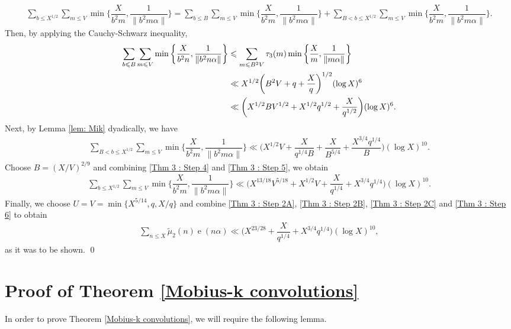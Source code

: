 \documentclass[11pt]{amsart}
\numberwithin{equation}{section}
\numberwithin{figure}{section}
\theoremstyle{definition}
\newcommand{\e}{\operatorname{e}}
\begin{document}
\begin{align*}
     \sum_{b\leqslant X ^{1/2}}\sum_{m\leqslant V}\min\bigg\{\dfrac{X}{b^2m}, \dfrac{1}{\|b^2m\alpha\|}\bigg\} =  \sum_{b\leqslant B}\sum_{m\leqslant V}\min\bigg\{\dfrac{X}{b^2m}, \dfrac{1}{\|b^2m\alpha\|}\bigg\} +  \sum_{B<b\leqslant X ^{1/2}}\sum_{m\leqslant V}\min\bigg\{\dfrac{X}{b^2m}, \dfrac{1}{\|b^2m\alpha\|}\bigg\}.
\end{align*}
Then, by applying the Cauchy-Schwarz inequality,
\begin{align}
    \sum_{b\leqslant B}\sum_{m\leqslant V}\min\bigg\{\dfrac{X}{b^2n}, \dfrac{1}{\|b^2n\alpha\|}\bigg\} &\leqslant\sum_{m\leqslant B^2V}\tau_3(m)\min\bigg\{\dfrac{X}{m}, \dfrac{1}{\|m\alpha\|}\bigg\} \notag \\
    &\ll X^{1/2}\bigg(B^2V + q + \dfrac{X}{q}\bigg)^{1/2} (\log X)^6 \notag\\
    &\ll \bigg(X^{1/2}BV^{1/2} + X^{1/2}q^{1/2} + \dfrac{X}{q^{1/2}}\bigg)(\log X)^6. \label{Thm 3 : Step 4}
\end{align}
Next, by Lemma \ref{lem: Mik} dyadically, we have
\begin{align}
  \sum_{B<b\leqslant X ^{1/2}}\sum_{m\leqslant V}\min\bigg\{\dfrac{X}{b^2m}, \dfrac{1}{\|b^2m\alpha\|}\bigg\} \ll \bigg(X^{1/2}V + \dfrac{X}{q^{1/4}B} + \dfrac{X}{B^{5/4}} + \dfrac{X^{3/4}q^{1/4}}{B}\bigg)(\log X)^{10}. \label{Thm 3 : Step 5} 
\end{align}
Choose $B=(X/V)^{2/9}$ and combining \eqref{Thm 3 : Step 4} and \eqref{Thm 3 : Step 5}, we obtain
\begin{align}
   \sum_{b\leqslant X ^{1/2}}\sum_{m\leqslant V}\min\bigg\{\dfrac{X}{b^2m}, \dfrac{1}{\|b^2m\alpha\|}\bigg\}\ll \bigg(X^{13/18}V^{5/18} + X^{1/2}V + \dfrac{X}{q^{1/4}} + X^{3/4}q^{1/4}\bigg)(\log X)^{10}. \label{Thm 3 : Step 6}  
\end{align}
Finally, we choose $U=V=\min\{ X^{5/14}, q, X/q \}$ and combine \eqref{Thm 3 : Step 2A}, \eqref{Thm 3 : Step 2B}, \eqref{Thm 3 : Step 2C} and \eqref{Thm 3 : Step 6} to obtain
\begin{align*}
    \sum_{n\leqslant X }\tilde{\mu}_2(n)\e(n\alpha)\ll \bigg(X^{23/28} + \dfrac{X}{q^{1/4}} + X^{3/4}q^{1/4}\bigg)(\log X)^{10},
\end{align*}
as it was to be shown.
\qed

\section{Proof of Theorem \ref{Mobius-k convolutions}} \label{sec:secondexpsumproof}
In order to prove Theorem \ref{Mobius-k convolutions}, we will require the following lemma. 
\end{document}
